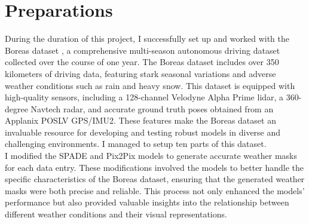 \chapter{Preparations}

During the duration of this project, I successfully set up and worked with the Boreas dataset \autocite[1]{burnett2023boreasmultiseasonautonomousdriving}, a comprehensive multi-season autonomous driving dataset collected over the course of one year. The Boreas dataset includes over 350 kilometers of driving data, featuring stark seasonal variations and adverse weather conditions such as rain and heavy snow. This dataset is equipped with high-quality sensors, including a 128-channel Velodyne Alpha Prime lidar, a 360-degree Navtech radar, and accurate ground truth poses obtained from an Applanix POSLV GPS/IMU2. These features make the Boreas dataset an invaluable resource for developing and testing robust models in diverse and challenging environments. I managed to setup ten parts of this dataset.
\\
I modified the SPADE and Pix2Pix models to generate accurate weather masks for each data entry. These modifications involved the models to better handle the specific characteristics of the Boreas dataset, ensuring that the generated weather masks were both precise and reliable. This process not only enhanced the models’ performance but also provided valuable insights into the relationship between different weather conditions and their visual representations.

